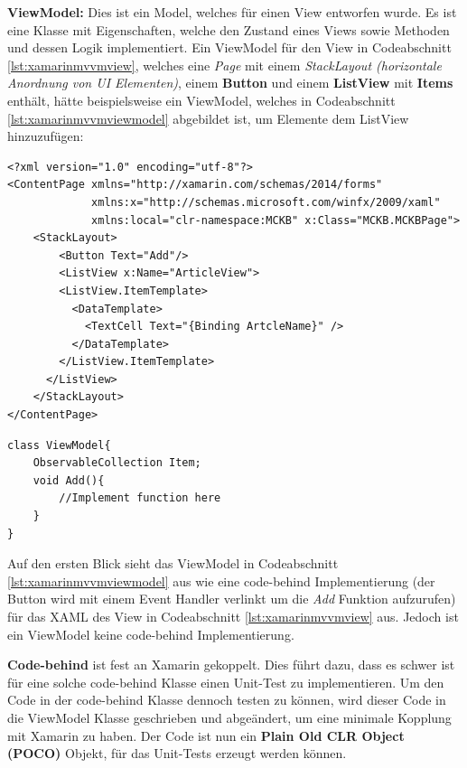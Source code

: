 	\textbf{ViewModel:} Dies ist ein Model, welches für einen View entworfen wurde. Es ist eine Klasse mit Eigenschaften, welche den Zustand eines Views sowie Methoden und dessen Logik implementiert.
	\newpage
	Ein ViewModel für den View in Codeabschnitt \ref{lst:xamarinmvvmview}, welches eine \textit{Page} mit einem \textit{StackLayout (horizontale Anordnung von UI Elementen)}, einem \textbf{Button} und einem \textbf{ListView} mit \textbf{Items} enthält, hätte beispielsweise ein ViewModel, welches in Codeabschnitt \ref{lst:xamarinmvvmviewmodel} abgebildet ist, um Elemente dem ListView hinzuzufügen:\\

	\begin{lstlisting}[caption={Beispiel View},label={lst:xamarinmvvmview},captionpos=b,style=JAVA-Own]
<?xml version="1.0" encoding="utf-8"?>
<ContentPage xmlns="http://xamarin.com/schemas/2014/forms"
             xmlns:x="http://schemas.microsoft.com/winfx/2009/xaml"
             xmlns:local="clr-namespace:MCKB" x:Class="MCKB.MCKBPage">
    <StackLayout>
        <Button Text="Add"/>
        <ListView x:Name="ArticleView">
        <ListView.ItemTemplate>
          <DataTemplate>
            <TextCell Text="{Binding ArtcleName}" />
          </DataTemplate>
        </ListView.ItemTemplate>
      </ListView>
    </StackLayout>
</ContentPage>
	\end{lstlisting}

	\begin{lstlisting}[caption={Beispiel ViewModel für Codeabschnitt \ref{lst:xamarinmvvmview} (View)},label={lst:xamarinmvvmviewmodel},captionpos=b,style=csharp]
class ViewModel{
	ObservableCollection Item;
	void Add(){
		//Implement function here
	}
}
	\end{lstlisting}

	Auf den ersten Blick sieht das ViewModel in Codeabschnitt \ref{lst:xamarinmvvmviewmodel} aus wie eine code-behind Implementierung (der Button wird mit einem Event Handler verlinkt um die \textit{Add} Funktion aufzurufen) für das XAML des View in Codeabschnitt \ref{lst:xamarinmvvmview} aus. Jedoch ist ein ViewModel keine code-behind Implementierung.

	\textbf{Code-behind} ist fest an Xamarin gekoppelt. Dies führt dazu, dass es schwer ist für eine solche code-behind Klasse einen Unit-Test zu implementieren. Um den Code in der code-behind Klasse dennoch testen zu können, wird dieser Code in die ViewModel Klasse geschrieben und abgeändert, um eine minimale Kopplung mit Xamarin zu haben. Der Code ist nun ein \textbf{Plain Old CLR Object (POCO)} Objekt, für das Unit-Tests erzeugt werden können.

